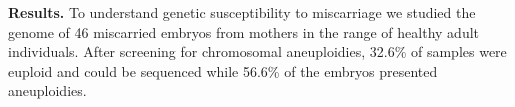 \documentclass[fleqn,12pt]{wlscirep}
\begin{document}
\textbf{Results.} To understand genetic susceptibility to miscarriage we studied the genome of 46 miscarried embryos %
from mothers in the range of healthy adult individuals. %
After screening for chromosomal aneuploidies, 32.6\% of samples were euploid and could be sequenced while 56.6\% of the embryos presented aneuploidies. %
\end{document}

